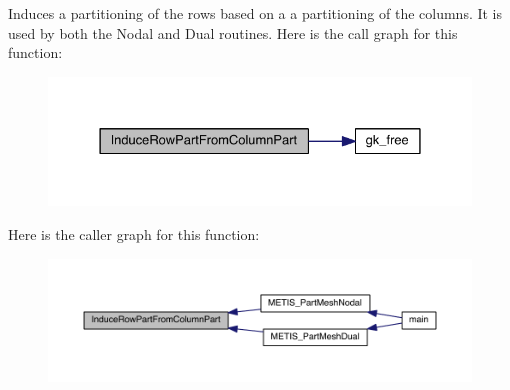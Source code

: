 Induces a partitioning of the rows based on a a partitioning of the columns. It is used by both the Nodal and Dual routines. Here is the call graph for this function\+:\nopagebreak
\begin{figure}[H]
\begin{center}
\leavevmode
\includegraphics[width=328pt]{a00236_ae1253bac89c47d556436695e62bcfacd_cgraph}
\end{center}
\end{figure}
Here is the caller graph for this function\+:\nopagebreak
\begin{figure}[H]
\begin{center}
\leavevmode
\includegraphics[width=350pt]{a00236_ae1253bac89c47d556436695e62bcfacd_icgraph}
\end{center}
\end{figure}
\mbox{\label{a00236_a8f496ac1cd2246b124da246b5c6f9193}} 
